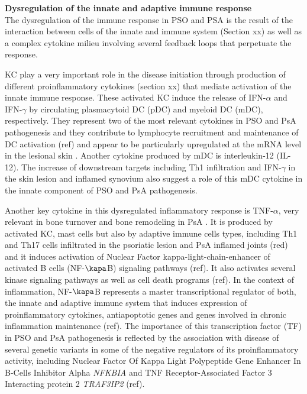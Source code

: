\textbf{Dysregulation of the innate and adaptive immune response}\\
The dysregulation of the immune response in PSO and PSA is the result of the interaction between cells of the innate and immune system (Section xx) as well as a complex cytokine milieu involving several feedback loops that perpetuate the response.

KC play a very important role in the disease initiation through production of different proinflammatory cytokines (section xx) that mediate activation of the innate immune response. These activated KC induce the release of IFN-$\alpha$ and IFN-$\gamma$ by circulating plasmacytoid DC (pDC) and myeloid DC (mDC), respectively. They represent two of the most relevant cytokines in PSO and PsA pathogenesis and they contribute to lymphocyte recruitment and maintenance of DC activation (ref) and appear to be particularly upregulated at the mRNA level in the lesional skin \parencite{Schmid1994}. Another cytokine produced by mDC is interleukin-12 (IL-12). The increase of downstream targets including Th1 infiltration and IFN-$\gamma$ in the skin lesion and inflamed synovium also suggest a role of this mDC cytokine in the innate component of PSO and PsA pathogenesis. 

Another key cytokine in this dysregulated inflammatory response is TNF-$\alpha$, very relevant in bone turnover and bone remodeling in PsA \parencite{Mensah2008}. It is produced by activated KC, mast cells but also by adaptive immune cells types, including Th1 and Th17 cells infiltrated in the psoriatic lesion and PsA inflamed joints (red) and it induces activation of Nuclear Factor kappa-light-chain-enhancer of activated B cells (NF-$\kapa$B) signaling pathways (ref). It also activates several kinase signaling pathways as well as cell death programs (ref). In the context of inflammation, NF-$\kapa$B represents a master transcriptional regulator of both, the innate and adaptive immune system that induces expression of proinflammatory cytokines, antiapoptotic genes and genes involved in chronic inflammation maintenance (ref). The importance of this transcription factor (TF) in PSO and PsA pathogenesis is reflected by the association with disease of several genetic variants in some of the negative regulators of its proinflammatory activity, including Nuclear Factor Of Kappa Light Polypeptide Gene Enhancer In B-Cells Inhibitor Alpha \textit{NFKBIA} and TNF Receptor-Associated Factor 3 Interacting protein 2 \textit{TRAF3IP2} (ref).
 
